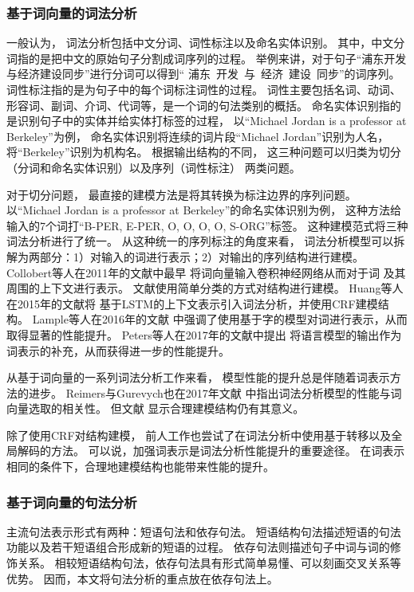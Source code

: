 \subsubsection{基于词向量的词法分析}\label{sec:intro:review:lang-anal:lex}
一般认为，
词法分析包括中文分词、词性标注以及命名实体识别。
其中，中文分词指的是把中文的原始句子分割成词序列的过程。
举例来讲，对于句子``浦东开发与经济建设同步''进行分词可以得到``
浦东\ 开发\ 与\ 经济\ 建设\ 同步''的词序列。
词性标注指的是为句子中的每个词标注词性的过程。
词性主要包括名词、动词、形容词、副词、介词、代词等，是一个词的句法类别的概括。
命名实体识别指的是识别句子中的实体并给实体打标签的过程，
以``Michael Jordan is a professor at Berkeley''为例，
命名实体识别将连续的词片段``Michael Jordan''识别为人名，将``Berkeley''识别为机构名。
根据输出结构的不同，
这三种问题可以归类为切分（分词和命名实体识别）以及序列（词性标注）
两类问题。

对于切分问题，
最直接的建模方法是将其转换为标注边界的序列问题\cite{Xue:2003:CWS:1119250.1119278,Ando:2005:FLP:1046920.1194905}。
以``Michael Jordan is a professor at Berkeley''的命名实体识别为例，
这种方法给输入的7个词打``B-PER, E-PER, O, O, O, O, S-ORG''标签。
这种建模范式将三种词法分析进行了统一。
从这种统一的序列标注的角度来看，
词法分析模型可以拆解为两部分：1）对输入的词进行表示；2）对输出的序列结构进行建模。
Collobert等人在2011年的文献中最早
将词向量输入卷积神经网络从而对于词
及其周围的上下文进行表示。
文献使用简单分类的方式对结构进行建模。
Huang等人在2015年的文献将
基于LSTM的上下文表示引入词法分析，并使用CRF建模结构。
Lample等人在2016年的文献
中强调了使用基于字的模型对词进行表示，从而取得显著的性能提升。
Peters等人在2017年的文献中提出
将语言模型的输出作为词表示的补充，从而获得进一步的性能提升。

从基于词向量的一系列词法分析工作来看，
模型性能的提升总是伴随着词表示方法的进步。
Reimers与Gurevych也在2017年文献
中指出词法分析模型的性能与词向量选取的相关性。
但文献
显示合理建模结构仍有其意义。

除了使用CRF对结构建模，
前人工作也尝试了在词法分析中使用基于转移以及全局解码的方法\cite{cai-zhao:2016:P16-1,zhou-EtAl:2017:EMNLP2017}。
可以说，加强词表示是词法分析性能提升的重要途径。
在词表示相同的条件下，合理地建模结构也能带来性能的提升。

\subsubsection{基于词向量的句法分析}\label{sec:intro:review:lang-anal:syn}
主流句法表示形式有两种：短语句法和依存句法。
短语结构句法描述短语的句法功能以及若干短语组合形成新的短语的过程。
依存句法则描述句子中词与词的修饰关系。
相较短语结构句法，依存句法具有形式简单易懂、可以刻画交叉关系等优势。
因而，本文将句法分析的重点放在依存句法上。

